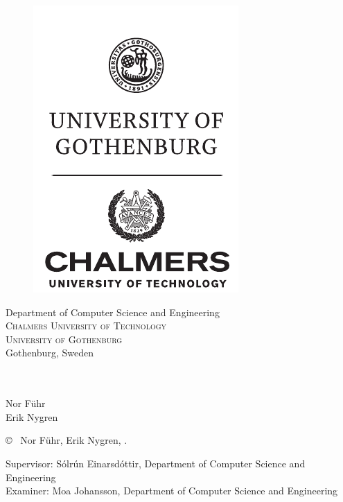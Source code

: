 {\begin{center}
  \vfill
  \begin{figure}[H]
  \centering
  \includegraphics[width=0.25\pdfpagewidth]{figure/auxiliary/ChGULogoHog.pdf}
  \end{figure}	\vspace{5mm}	

  Department of Computer Science and Engineering\\
  \textsc{Chalmers University of Technology} \\
  \textsc{University of Gothenburg} \\
  Gothenburg, Sweden \the\year \\
\end{center}


\newpage
\thispagestyle{plain}
\vspace*{4.5cm}
\oneLineTitle\\
\oneLineSubtitle\\
Nor Führ\\Erik Nygren

\setlength{\parskip}{1cm}

\copyright ~ Nor Führ, Erik Nygren, \the\year. \setlength{\parskip}{1cm}

Supervisor: Sólrún Einarsdóttir, Department of Computer Science and Engineering\\
Examiner: Moa Johansson, Department of Computer Science and Engineering \setlength{\parskip}{1cm}

}
